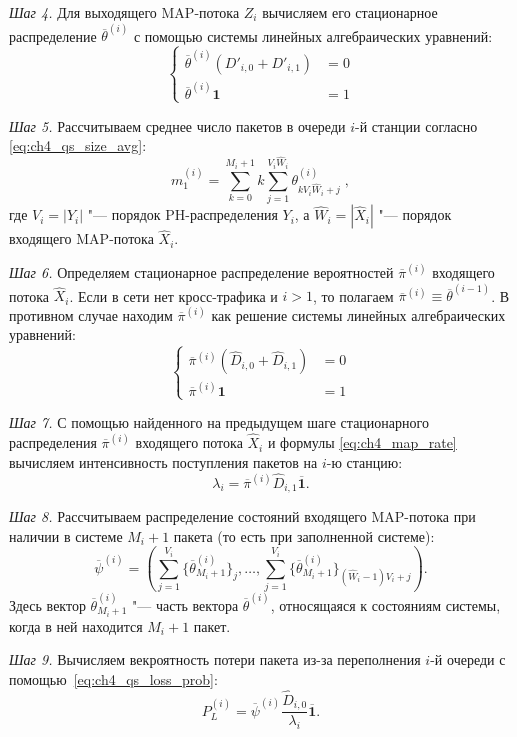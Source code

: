 \textit{Шаг 4.} Для выходящего MAP-потока $Z_i$ вычисляем его стационарное распределение $\overline{\theta}^{(i)}$ с помощью системы линейных алгебраических уравнений:
$$
  \begin{cases}
	  \overline{\theta}^{(i)}(D'_{i,0} + D'_{i,1}) &= 0\\
	  \overline{\theta}^{(i)} \mathbf{1} &= 1
  \end{cases}
$$

\textit{Шаг 5.} Рассчитываем среднее число пакетов в очереди $i$-й станции согласно \eqref{eq:ch4_qs_size_avg}:
$$
  m_1^{(i)} = \sum\limits_{k=0}^{M_i + 1} k \sum\limits_{j=1}^{V_i \hat{W}_i} \theta^{(i)}_{k V_i \hat{W}_i + j}\;,
$$
где $V_i = |Y_i|$ "--- порядок PH-распределения $Y_i$, а $\hat{W}_i = |\hat{X}_i|$ "--- порядок входящего MAP-потока $\hat{X}_i$.

\textit{Шаг 6.} Определяем стационарное распределение вероятностей $\overline{\pi}^{(i)}$ входящего потока $\hat{X}_i$. Если в сети нет кросс-трафика и $i > 1$, то полагаем $\overline{\pi}^{(i)} \equiv \overline{\theta}^{(i-1)}$. В противном случае находим $\overline{\pi}^{(i)}$ как решение системы линейных алгебраических уравнений:
$$
  \begin{cases}
	  \overline{\pi}^{(i)}(\hat{D}_{i,0} + \hat{D}_{i,1}) &= 0\\
	  \overline{\pi}^{(i)} \mathbf{1} &= 1
  \end{cases}
$$

\textit{Шаг 7.} С помощью найденного на предыдущем шаге стационарного распределения $\overline{\pi}^{(i)}$ входящего потока $\hat{X}_i$ и формулы \eqref{eq:ch4_map_rate} вычисляем интенсивность поступления пакетов на $i$-ю станцию:
$$
  \lambda_i = \overline{\pi}^{(i)} \hat{D}_{i,1} \overline{\mathbf{1}}.
$$

\textit{Шаг 8.} Рассчитываем распределение состояний входящего MAP-потока при наличии в системе $M_i + 1$ пакета (то есть при заполненной системе):
$$
  \overline{\psi}^{(i)} = \left(
  \sum\limits_{j=1}^{V_i} \{ \overline{\theta}^{(i)}_{M_i+1} \}_j,
  \dots,
  \sum\limits_{j=1}^{V_i} \{ \overline{\theta}^{(i)}_{M_i+1} \}_{(\hat{W}_i-1) V_i + j}
  \right).
$$
Здесь вектор $\overline{\theta}_{M_i+1}^{(i)}$ "--- часть вектора $\overline{\theta}^{(i)}$, относящаяся к состояниям системы, когда в ней находится $M_i + 1$ пакет.

\textit{Шаг 9.} Вычисляем векроятность потери пакета из-за переполнения $i$-й очереди с помощью~\eqref{eq:ch4_qs_loss_prob}:
$$
  P_L^{(i)} = \overline{\psi}^{(i)} \frac{\hat{D}_{i,0}}{\lambda_i} \overline{\mathbf{1}}.
$$


